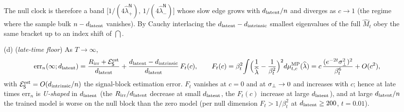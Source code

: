 \begin{proposition}
\begin{enumerate}
\begin{equation}
\end{equation}
The null clock is therefore a band $\big[1/(4\widehat\lambda^{\mathsf N}_+),\,1/(4\widehat\lambda^{\mathsf N}_-)\big]$ whose slow edge grows with $\dlat/\nsamp$ and diverges as $c\to1$ (the regime where the sample bulk $\nsamp-\dlat$ vanishes). By Cauchy interlacing the $\dlat-\dint$ smallest eigenvalues of the full $\widehat M_t$ obey the same bracket up to an index shift of $\dint$.
\item[(d)] (\emph{late-time floor}) As $T\to\infty$,
\begin{equation}\label{eq:lin-floor}
\mathrm{err}_n(\infty;d_{\mathrm{latent}})=\frac{R_{\mathrm{irr}}+\mathcal E^{\rm est}_{\mathsf S}}{d_{\mathrm{latent}}}+\frac{d_{\mathrm{latent}}-d_{\mathrm{intrinsic}}}{d_{\mathrm{latent}}}\,F_t(c),\qquad F_t(c)=\beta_t^2\!\int\!\Big(\frac1{\widehat\lambda}-\frac1{\beta_t^2}\Big)^2d\mu^{\rm MP}_{t,c}(\widehat\lambda)=c\,\frac{(e^{-2t}\sigma_{\perp}^2)^2}{\beta_t^6}+O(c^2),
\end{equation}
with $\mathcal E^{\rm est}_{\mathsf S}=O(d_{\mathrm{intrinsic}}/n)$ the signal-block estimation error. $F_t$ vanishes at $c=0$ and at $\sigma_{\perp}\to0$ and increases with $c$; hence at late times $\mathrm{err}_n$ is \emph{U-shaped} in $d_{\mathrm{latent}}$ (the $R_{\mathrm{irr}}/d_{\mathrm{latent}}$ decrease at small $d_{\mathrm{latent}}$, the $F_t(c)$ increase at large $d_{\mathrm{latent}}$), and at large $\dlat/\nsamp$ the trained model is worse on the null block than the zero model (per null dimension $F_t>1/\beta_t^2$ at $d_{\mathrm{latent}}\ge200$, $t=0.01$).
\end{enumerate}
\end{proposition}
